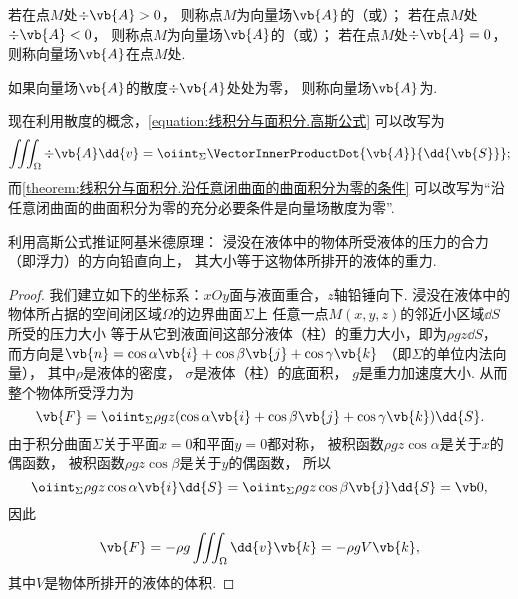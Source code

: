 \begin{definition}
若在点\(M\)处\(\div{\vb{A}}>0\)，
则称点\(M\)为向量场\(\vb{A}\)的（或）；
若在点\(M\)处\(\div{\vb{A}}<0\)，
则称点\(M\)为向量场\(\vb{A}\)的（或）；
若在点\(M\)处\(\div{\vb{A}}=0\)，
则称向量场\(\vb{A}\)在点\(M\)处.

如果向量场\(\vb{A}\)的散度\(\div{\vb{A}}\)处处为零，
则称向量场\(\vb{A}\)为.
\end{definition}

现在利用散度的概念，\cref{equation:线积分与面积分.高斯公式} 可以改写为
\begin{equation}\label{equation:线积分与面积分.高斯公式1}
	\iiint_\Omega \div{\vb{A}} \dd{v}
	= \oiint_\Sigma \VectorInnerProductDot{\vb{A}}{\dd{\vb{S}}};
\end{equation}
而\cref{theorem:线积分与面积分.沿任意闭曲面的曲面积分为零的条件}
可以改写为“沿任意闭曲面的曲面积分为零的充分必要条件是向量场散度为零”.

\begin{example}
利用高斯公式推证阿基米德原理：
浸没在液体中的物体所受液体的压力的合力（即浮力）的方向铅直向上，
其大小等于这物体所排开的液体的重力.
\begin{proof}
我们建立如下的坐标系：\(xOy\)面与液面重合，\(z\)轴铅锤向下.
浸没在液体中的物体所占据的空间闭区域\(\Omega\)的边界曲面\(\Sigma\)上
任意一点\(M(x,y,z)\)的邻近小区域\(\dd{S}\)所受的压力大小
等于从它到液面间这部分液体（柱）的重力大小，即为\(\rho g z \dd{S}\)，
而方向是\(\vb{n}=\cos\alpha\vb{i}+\cos\beta\vb{j}+\cos\gamma\vb{k}\)
（即\(\Sigma\)的单位内法向量），
其中\(\rho\)是液体的密度，
\(\sigma\)是液体（柱）的底面积，
\(g\)是重力加速度大小.
从而整个物体所受浮力为\begin{equation*}
	\vb{F}
	= \oiint_\Sigma \rho g z
		(\cos\alpha\vb{i}+\cos\beta\vb{j}+\cos\gamma\vb{k}) \dd{S}.
\end{equation*}
由于积分曲面\(\Sigma\)关于平面\(x=0\)和平面\(y=0\)都对称，
被积函数\(\rho g z \cos\alpha\)是关于\(x\)的偶函数，
被积函数\(\rho g z \cos\beta\)是关于\(y\)的偶函数，
所以\begin{equation*}
	\oiint_\Sigma \rho g z \cos\alpha \vb{i} \dd{S}
	= \oiint_\Sigma \rho g z \cos\beta \vb{j} \dd{S}
	= \vb0,
\end{equation*}
因此\begin{equation*}
	\vb{F}
	= -\rho g \iiint_\Omega \dd{v} \vb{k}
	= -\rho g V \vb{k},
\end{equation*}
其中\(V\)是物体所排开的液体的体积.
\end{proof}
\end{example}

